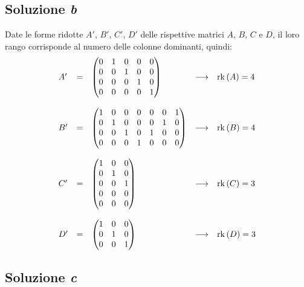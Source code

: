 \documentclass[a4paper]{article}
\makeatletter
\DeclareMathOperator{\rk}{rk}
\newenvironment{rowequmat}[1]{\left(\array{@{}#1@{}}}{\endarray\right)}
\makeatother
\begin{document}
	\subsection{Soluzione \emph{b}}\label{soluzione b}
	
	Date le forme ridotte $A'$, $B'$, $C'$, $D'$ delle rispettive matrici $A$, $B$, $C$ e $D$, il loro rango corrisponde al numero delle colonne dominanti, quindi:
	\begin{equation*}
		\begin{array}{lllll}
			A' & = & \begin{rowequmat}{ccccc}
				0 & 1 & 0 & 0 & 0 \\
				0 & 0 & 1 & 0 & 0 \\
				0 & 0 & 0 & 1 & 0 \\
				0 & 0 & 0 & 0 & 1
			\end{rowequmat} & \longrightarrow & \rk\left(A\right) = 4 \\
			\\
			B' & = & \begin{rowequmat}{ccccccc}
				1 & 0 & 0 & 0 & 0 & 0 & 1 \\
				0 & 1 & 0 & 0 & 0 & 1 & 0 \\
				0 & 0 & 1 & 0 & 1 & 0 & 0 \\
				0 & 0 & 0 & 1 & 0 & 0 & 0
			\end{rowequmat} & \longrightarrow & \rk\left(B\right) = 4 \\
			\\
			C' & = & \begin{rowequmat}{ccc}
				1 & 0 & 0 \\ 
				0 & 1 & 0 \\ 
				0 & 0 & 1 \\ 
				0 & 0 & 0 \\ 
				0 & 0 & 0
			\end{rowequmat} & \longrightarrow & \rk\left(C\right) = 3 \\
			\\
			D' & = & \begin{rowequmat}{ccc}
				1  & 0  & 0 \\ 
				0  & 1  & 0 \\ 
				0  & 0  & 1
			\end{rowequmat} & \longrightarrow & \rk\left(D\right) = 3
		\end{array}
	\end{equation*}\newpage
	
	\subsection{Soluzione \emph{c}}
	
\end{document}
